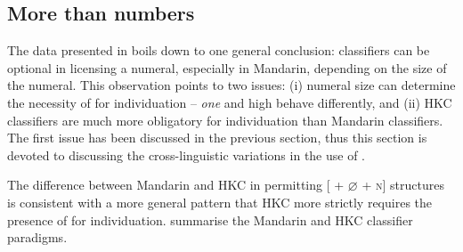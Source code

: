 \documentclass[output=paper]{langsci/langscibook}
\begin{document}
\subsection{More than numbers}\label{sub:23.2.3}

The data presented in  boils down to one general conclusion:
classifiers can be optional in licensing a numeral, especially in
Mandarin, depending on the size of the numeral. This
observation points to two issues: (i) numeral size can determine
the necessity of  for individuation -- \emph{one} and high
 behave differently, and (ii) \gls{HKC} classifiers are much more
obligatory for individuation than Mandarin classifiers. The first issue has
been discussed in the previous section, thus this section is devoted to
discussing the cross-linguistic variations in the use of .

The difference between Mandarin and \gls{HKC} in permitting [\Num{} +
${\varnothing}$ + \textsc{n}] structures is consistent with a more general pattern that
\gls{HKC} more strictly requires the presence of  for individuation.
 summarise the Mandarin and \gls{HKC} classifier
paradigms.
\end{document}
